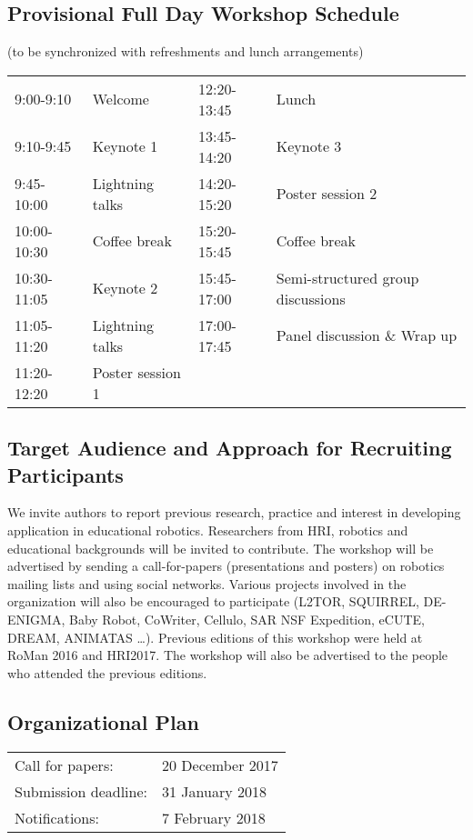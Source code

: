 \documentclass{sig-alternate-05-2015}
\begin{document}
\subsection*{Provisional Full Day Workshop Schedule} (to be synchronized with refreshments and lunch arrangements)
\begin{table}[h]
\begin{tabular}{p{1cm} l || p{1cm} p{2.5cm}}
9:00-9:10 	& Welcome 			& 12:20-13:45 & Lunch \\
9:10-9:45 	& Keynote 1 		& 13:45-14:20 & Keynote 3 \\
9:45-10:00 	& Lightning talks 	& 14:20-15:20 & Poster session 2 \\
10:00-10:30 & Coffee break 		& 15:20-15:45 & Coffee break \\
10:30-11:05 & Keynote 2 		& 15:45-17:00 & Semi-structured group discussions \\
11:05-11:20 & Lightning talks 	& 17:00-17:45 & Panel discussion \& Wrap up \\
11:20-12:20 & Poster session 1 	& & \\
\end{tabular}
\end{table}


\subsection*{Target Audience and Approach for Recruiting Participants}
We invite authors to report previous research, practice and interest in developing application in educational robotics. Researchers from HRI, robotics and educational backgrounds will be invited to contribute.
The workshop will be advertised by sending a call-for-papers (presentations and posters) on robotics mailing lists and using social networks. Various projects involved in the organization will also be encouraged to participate (L2TOR, SQUIRREL, DE-ENIGMA, Baby Robot, CoWriter, Cellulo, SAR NSF Expedition, eCUTE, DREAM, ANIMATAS …). Previous editions of this workshop were held at RoMan 2016 and HRI2017. The workshop will also be advertised to the people who attended the previous editions. 

\subsection*{Organizational Plan}
\begin{table}[h]
	\begin{tabular}{l l}
	Call for papers: 		& 20 December 2017 \\
	Submission deadline:	& 31 January 2018 \\ 
	Notifications:			& 7 February 2018 \\
	\end{tabular}
\end{table}
\end{document}
